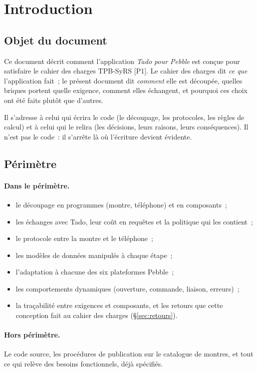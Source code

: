 \section{Introduction}

\subsection{Objet du document}

Ce document décrit comment l'application \emph{Tado pour Pebble} est conçue pour satisfaire
le cahier des charges TPB-SyRS [P1]. Le cahier des charges dit \emph{ce que} l'application
fait~; le présent document dit \emph{comment} elle est découpée, quelles briques portent
quelle exigence, comment elles échangent, et pourquoi ces choix ont été faits plutôt que
d'autres.

Il s'adresse à celui qui écrira le code (le découpage, les protocoles, les règles de calcul)
et à celui qui le relira (les décisions, leurs raisons, leurs conséquences). Il n'est pas le
code~: il s'arrête là où l'écriture devient évidente.

\subsection{Périmètre}

\paragraph{Dans le périmètre.}
\begin{itemize}
  \item le découpage en programmes (montre, téléphone) et en composants~;
  \item les échanges avec Tado, leur coût en requêtes et la politique qui les contient~;
  \item le protocole entre la montre et le téléphone~;
  \item les modèles de données manipulés à chaque étape~;
  \item l'adaptation à chacune des six plateformes Pebble~;
  \item les comportements dynamiques (ouverture, commande, liaison, erreurs)~;
  \item la traçabilité entre exigences et composants, et les retours que cette conception
        fait au cahier des charges (§\ref{sec:retours}).
\end{itemize}

\paragraph{Hors périmètre.} Le code source, les procédures de publication sur le catalogue
de montres, et tout ce qui relève des besoins fonctionnels, déjà spécifiés.

